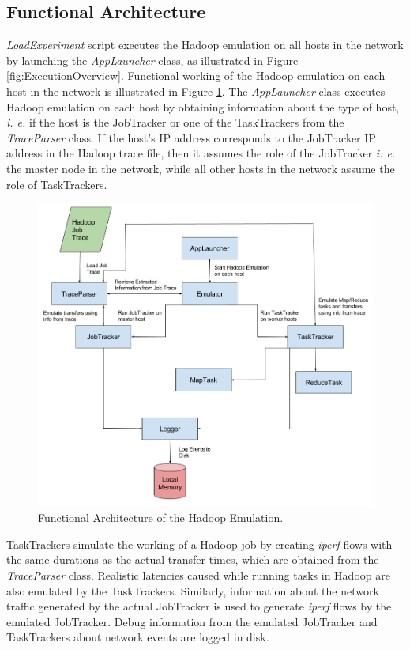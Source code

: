 \subsection{Functional Architecture}

\textit{LoadExperiment} script executes the Hadoop emulation on all hosts in the network by launching the \textit{AppLauncher} class, as illustrated in Figure \ref{fig:ExecutionOverview}. Functional working of the Hadoop emulation on each host in the network is illustrated in Figure \ref{fig:HadoopEmuArch}. The \textit{AppLauncher} class executes Hadoop emulation on each host by obtaining information about the type of host, \textit{i. e.} if the host is the JobTracker or one of the TaskTrackers from the \textit{TraceParser} class. If the host's IP address corresponds to the JobTracker IP address in the Hadoop trace file, then it assumes the role of the JobTracker \textit{i. e.} the master node in the network, while all other hosts in the network assume the role of TaskTrackers.

\begin{figure}[!ht] 
	\centerline{\includegraphics[scale=0.46]{graphics/chapter5/HadoopEmulationArchitecture.png}}
	\caption{Functional Architecture of the Hadoop Emulation.}
	\label{fig:HadoopEmuArch}
\end{figure}

TaskTrackers simulate the working of a Hadoop job by creating \textit{iperf} flows with the same durations as the actual transfer times, which are obtained from the \textit{TraceParser} class. Realistic latencies caused while running  tasks in Hadoop are also emulated by the TaskTrackers. Similarly, information about  the network traffic generated by the actual JobTracker is used to generate \textit{iperf} flows by the emulated JobTracker. Debug information from the emulated JobTracker and TaskTrackers about network events are logged in disk.      

